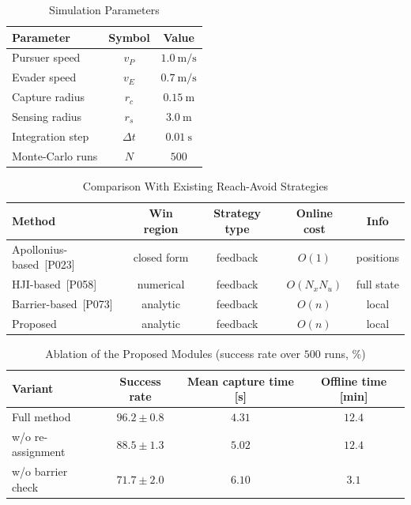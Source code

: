 
\begin{table}[!t]
\centering
\caption{Simulation Parameters}
\label{tab:params}
\begin{tabular}{lcc}
\toprule
Parameter & Symbol & Value \\
\midrule
Pursuer speed & $v_P$ & $1.0~\mathrm{m/s}$ \\
Evader speed & $v_E$ & $0.7~\mathrm{m/s}$ \\
Capture radius & $r_c$ & $0.15~\mathrm{m}$ \\
Sensing radius & $r_s$ & $3.0~\mathrm{m}$ \\
Integration step & $\Delta t$ & $0.01~\mathrm{s}$ \\
Monte-Carlo runs & $N$ & $500$ \\
\bottomrule
\end{tabular}
\end{table}

\begin{table}[!t]
\centering
\caption{Comparison With Existing Reach-Avoid Strategies}
\label{tab:comparison}
\begin{tabular}{lcccc}
\toprule
Method & Win region & Strategy type & Online cost & Info \\
\midrule
Apollonius-based~[P023] & closed form & feedback & $O(1)$ & positions \\
HJI-based~[P058] & numerical & feedback & $O(N_x N_u)$ & full state \\
Barrier-based~[P073] & analytic & feedback & $O(n)$ & local \\
Proposed & analytic & feedback & $O(n)$ & local \\
\bottomrule
\end{tabular}
\end{table}

\begin{table}[!t]
\centering
\caption{Ablation of the Proposed Modules (success rate over $500$ runs, $\%$)}
\label{tab:ablation}
\begin{tabular}{lccc}
\toprule
Variant & Success rate & Mean capture time [s] & Offline time [min] \\
\midrule
Full method & $96.2 \pm 0.8$ & $4.31$ & $12.4$ \\
w/o re-assignment & $88.5 \pm 1.3$ & $5.02$ & $12.4$ \\
w/o barrier check & $71.7 \pm 2.0$ & $6.10$ & $3.1$ \\
\bottomrule
\end{tabular}
\end{table}
